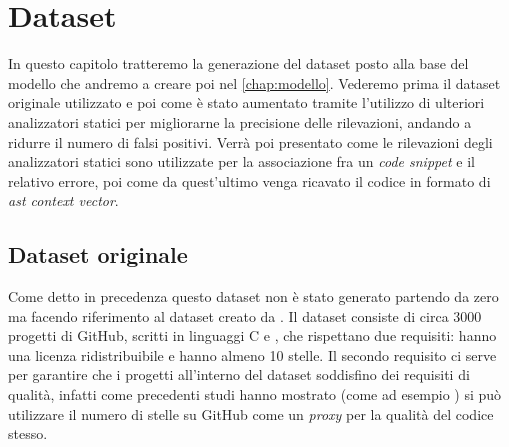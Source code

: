 \chapter{Dataset}\label{chap:dataset}
In questo capitolo tratteremo la generazione del dataset posto alla base del modello che andremo a creare poi nel \autoref{chap:modello}. 
Vederemo prima il dataset originale utilizzato e poi come è stato aumentato tramite l'utilizzo di ulteriori analizzatori statici per migliorarne la precisione delle rilevazioni, andando a ridurre il numero di falsi positivi.
Verrà poi presentato come le rilevazioni degli analizzatori statici sono utilizzate per la associazione fra un \textit{code snippet} e il relativo errore, poi come da quest'ultimo venga ricavato il codice in formato di \textit{ast context vector}.

\section{Dataset originale}
Come detto in precedenza questo dataset non è stato generato partendo da zero ma facendo riferimento al dataset creato da \cite{gelman2019source}. Il dataset consiste di circa 3000 progetti di GitHub, scritti in linguaggi C e \CPP,
 che rispettano due requisiti: hanno una licenza ridistribuibile e hanno almeno 10 stelle.
 Il secondo requisito ci serve per garantire che i progetti all'interno del dataset soddisfino dei requisiti di qualità, infatti come precedenti studi hanno mostrato (come ad esempio \cite{papamichail2016user}) si può utilizzare il numero
 di stelle su GitHub come un \textit{proxy} per la qualità del codice stesso.

